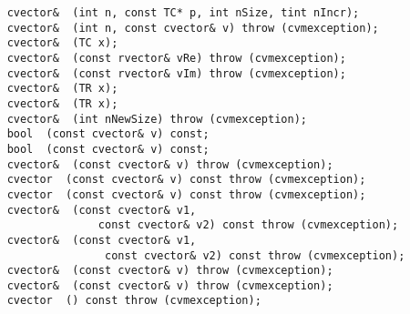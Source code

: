 \verb"    cvector& "\verb" (int n, const TC* p, int nSize, tint nIncr);"\\
\verb"    cvector& "\verb" (int n, const cvector& v) throw (cvmexception);"\\
\verb"    cvector& "\verb" (TC x);"\\
\verb"    cvector& "\verb" (const rvector& vRe) throw (cvmexception);"\\
\verb"    cvector& "\verb" (const rvector& vIm) throw (cvmexception);"\\
\verb"    cvector& "\verb" (TR x);"\\
\verb"    cvector& "\verb" (TR x);"\\
\verb"    cvector& "\verb" (int nNewSize) throw (cvmexception);"\\
\verb"    bool "\verb" (const cvector& v) const;"\\
\verb"    bool "\verb" (const cvector& v) const;"\\
\verb"    cvector& "\verb" (const cvector& v) throw (cvmexception);"\\
\verb"    cvector "\verb" (const cvector& v) const throw (cvmexception);"\\
\verb"    cvector "\verb" (const cvector& v) const throw (cvmexception);"\\
\verb"    cvector& "\verb" (const cvector& v1,"\\
\verb"                  const cvector& v2) const throw (cvmexception);"\\
\verb"    cvector& "\verb" (const cvector& v1,"\\
\verb"                   const cvector& v2) const throw (cvmexception);"\\
\verb"    cvector& "\verb" (const cvector& v) throw (cvmexception);"\\
\verb"    cvector& "\verb" (const cvector& v) throw (cvmexception);"\\
\verb"    cvector "\verb" () const throw (cvmexception);"\\
